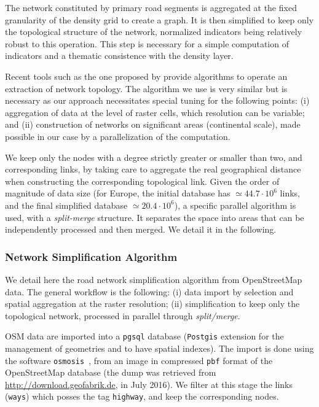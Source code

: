 \documentclass[11pt]{article}
\begin{document}
The network constituted by primary road segments is aggregated at the fixed granularity of the density grid to create a graph. It is then simplified to keep only the topological structure of the network, normalized indicators being relatively robust to this operation. This step is necessary for a simple computation of indicators and a thematic consistence with the density layer.

Recent tools such as the one proposed by \cite{boeing2017osmnx} provide algorithms to operate an extraction of network topology. The algorithm we use is very similar but is necessary as our approach necessitates special tuning for the following points: (i) aggregation of data at the level of raster cells, which resolution can be variable; and (ii) construction of networks on significant areas (continental scale), made possible in our case by a parallelization of the computation.


We keep only the nodes with a degree strictly greater or smaller than two, and corresponding links, by taking care to aggregate the real geographical distance when constructing the corresponding topological link. Given the order of magnitude of data size (for Europe, the initial database has $\simeq 44.7\cdot 10^6$ links, and the final simplified database $\simeq 20.4\cdot 10^6$), a specific parallel algorithm is used, with a \emph{split-merge} structure. It separates the space into areas that can be independently processed and then merged. We detail it in the following.


\subsubsection{Network Simplification Algorithm}


We detail here the road network simplification algorithm from OpenStreetMap data. The general workflow is the following: (i) data import by selection and spatial aggregation at the raster resolution; (ii) simplification to keep only the topological network, processed in parallel through \emph{split/merge}.

OSM data are imported into a \texttt{pgsql} database (\texttt{Postgis} extension for the management of geometries and to have spatial indexes). The import is done using the software \texttt{osmosis}~\cite{osmosis}, from an image in compressed \texttt{pbf} format of the OpenStreetMap database (the dump was retrieved from \url{http://download.geofabrik.de}, in July 2016). We filter at this stage the links (\texttt{ways}) which posses the tag \texttt{highway}, and keep the corresponding nodes.
\end{document}
